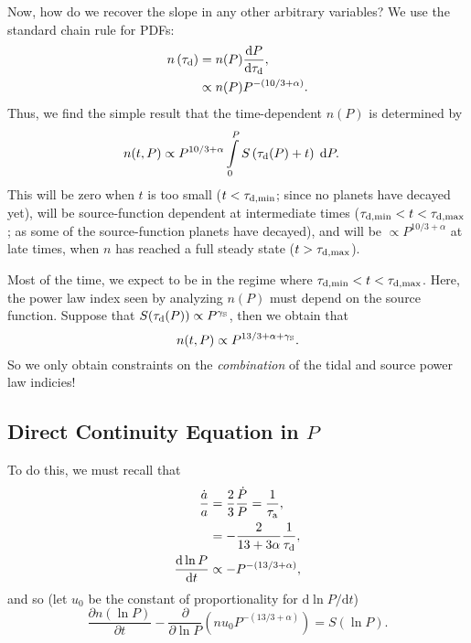 \documentclass[12pt]{article}
\newcommand*{\rd}[2]{\frac{\mathrm{d}#1}{\mathrm{d}#2}}
\newcommand*{\pd}[2]{\frac{\partial#1}{\partial#2}}
\newcommand*{\rdil}[2]{\mathrm{d}#1 / \mathrm{d}#2}
\newcommand*{\p}[1]{\left(#1\right)}
\begin{document}
Now, how do we recover the slope in any other arbitrary variables?
We use the standard chain rule for PDFs:
\begin{align}
    n\p{\tau_{\rm d}}
        &=
            n(P) \rd{P}{\tau_{\rm d}},\\
        &\propto n(P) P^{-(10/3 + \alpha)}.
\end{align}
Thus, we find the simple result that the time-dependent $n(P)$ is determined by
\begin{align}
    n(t, P)
        &\propto
            P^{10/3 + \alpha}
                \int\limits_0^{P}
                    S\p{\tau_{\rm d}(P) + t}\;\mathrm{d}P.
\end{align}
This will be zero when $t$ is too small ($t < \tau_{\rm d, \min}$; since no
planets have decayed yet),
will be source-function dependent at intermediate times ($\tau_{\rm d, \min} < t
< \tau_{\rm d, \max}$; as some of the source-function planets have decayed), and
will be $\propto P^{10/3 + \alpha}$ at late times, when $n$ has reached a full
steady state ($t > \tau_{\rm d, \max}$).

Most of the time, we expect to be in the regime where $\tau_{\rm d, \min} < t
< \tau_{\rm d, \max}$.
Here, the power law index seen by analyzing $n(P)$ must depend on the source
function.
Suppose that $S(\tau_{\rm d}(P)) \propto P^{\gamma_{\rm S}}$, then we obtain
that
\begin{equation}
    n(t, P)
        \propto
            P^{13/3 + \alpha + \gamma_{\rm S}}.
\end{equation}
So we only obtain constraints on the \emph{combination} of the tidal and source
power law indicies!

\subsection{Direct Continuity Equation in $P$}

To do this, we must recall that
\begin{align}
    \frac{\dot{a}}{a}
        &= \frac{2}{3}\frac{\dot{P}}{P}
        = \frac{1}{\tau_{\rm a}},\\
        &= -\frac{2}{13 + 3\alpha}\frac{1}{\tau_{\rm d}},\\
    \rd{\ln P}{t}
        &\propto
            -P^{-(13/3 + \alpha)},
\end{align}
and so (let $u_0$ be the constant of proportionality for $\rdil{\ln P}{t}$)
\begin{equation}
    \pd{n(\ln P)}{t}
        - \pd{}{\ln P}\p{n u_0P^{-(13/3 + \alpha)}}
        = S(\ln P).
\end{equation}
\end{document}
